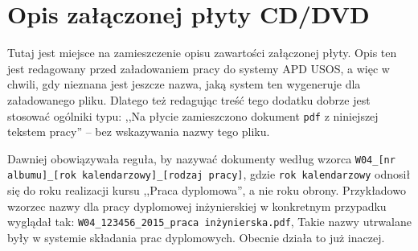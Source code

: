 \chapter{Opis załączonej płyty CD/DVD}
\label{chap:opis-plyty}
Tutaj jest miejsce na zamieszczenie opisu zawartości załączonej płyty. Opis ten jest redagowany przed załadowaniem pracy do systemy APD USOS, a więc w chwili, gdy nieznana jest jeszcze nazwa, jaką system ten wygeneruje dla załadowanego pliku. Dlatego też redagując treść tego dodatku dobrze jest stosować ogólniki typu: ,,Na płycie zamieszczono dokument \texttt{pdf} z niniejszej tekstem pracy'' -- bez wskazywania nazwy tego pliku. 

Dawniej obowiązywała reguła, by nazywać dokumenty według wzorca \texttt{W04\_[nr albumu]\_[rok kalendarzowy]\_[rodzaj pracy]}, gdzie \texttt{rok kalendarzowy} odnosił się do roku realizacji kursu ,,Praca dyplomowa'', a nie roku obrony. Przykładowo wzorzec nazwy dla pracy dyplomowej inżynierskiej w konkretnym przypadku wyglądał tak: \texttt{W04\_123456\_2015\_praca inżynierska.pdf},  Takie nazwy utrwalane były w systemie składania prac dyplomowych. Obecnie działa to już inaczej.